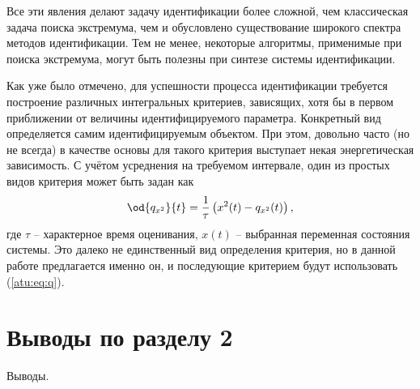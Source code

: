 Все эти явления делают задачу идентификации более сложной, чем
классическая задача поиска экстремума, чем и обусловлено
существование широкого спектра методов идентификации. Тем не менее,
некоторые алгоритмы, применимые при поиска экстремума, могут быть
полезны при синтезе системы идентификации.

Как уже было отмечено, для успешности процесса идентификации требуется
построение различных интегральных критериев, зависящих,
хотя бы в первом приближении
от величины идентифицируемого параметра. Конкретный вид определяется самим идентифицируемым
объектом. При этом, довольно часто (но не всегда) в качестве основы для такого критерия выступает
некая энергетическая зависимость. С учётом усреднения на требуемом интервале,
один из простых видов критерия может быть задан как
%
\begin{equation}
\od{q_{x^2}}{t}
=
\frac{1}{\tau} \left( x^2(t) - q_{x^2}(t) \right)
,
\label{atu:eq:q}
\end{equation}
%
где $\tau$ -- характерное время оценивания, $x(t)$ -- выбранная переменная состояния системы.
Это далеко не единственный вид определения критерия, но в данной работе предлагается именно он,
и последующие критерием будут использовать (\ref{atu:eq:q}).

\section{Выводы по разделу 2}

Выводы.

